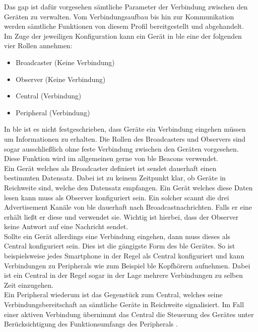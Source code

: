 \noindent Das \ac{gap} ist dafür vorgesehen sämtliche Parameter der Verbindung zwischen den Geräten zu verwalten. Vom Verbindungsaufbau bis hin zur Kommunikation werden sämtliche Funktionen von diesem Profil bereitgestellt und abgehandelt.\\

\noindent Im Zuge der jeweiligen Konfiguration kann ein Gerät in \ac{ble} eine der folgenden vier Rollen annehmen:
\begin{itemize}
	\item{Broadcaster (Keine Verbindung)}
	\item{Observer (Keine Verbindung)}
	\item{Central (Verbindung)}
	\item{Peripheral (Verbindung)}
\end{itemize}   

\noindent In \ac{ble} ist es nicht festgeschrieben, dass Geräte ein Verbindung eingehen müssen um Informationen zu erhalten. Die Rollen des Broadcasters und Observers sind sogar ausschließlich ohne feste Verbindung zwischen den Geräten vorgesehen. Diese Funktion wird im allgemeinen gerne von \ac{ble} Beacons verwendet.\\

\noindent Ein Gerät welches als Broadcaster definiert ist sendet dauerhaft einen bestimmten Datensatz. Dabei ist zu keinem Zeitpunkt klar, ob Geräte in Reichweite sind, welche den Datensatz empfangen. Ein Gerät welches diese Daten lesen kann muss als Observer konfiguriert sein. Ein solcher scannt die drei Advertisement Kanäle von \ac{ble} dauerhaft nach Broadcastnachrichten. Falls er eine erhält ließt er diese und verwendet sie. Wichtig ist hierbei, dass der Observer keine Antwort auf eine Nachricht sendet.\\  

\noindent Sollte ein Gerät allerdings eine Verbindung eingehen, dann muss dieses als Central konfiguriert sein. Dies ist die gängigste Form des \ac{ble} Gerätes. So ist beispielsweise jedes Smartphone in der Regel als Central konfiguriert und kann Verbindungen zu Peripherals wie zum Beispiel \ac{ble} Kopfhörern aufnehmen. Dabei ist ein Central in der Regel sogar in der Lage mehrere Verbindungen zu selben Zeit einzugehen.\\

\noindent Ein Peripheral wiederum ist das Gegenstück zum Central, welches seine Verbindungsbereitschaft an sämtliche Geräte in Reichweite signalisiert. Im Fall einer aktiven Verbindung übernimmt das Central die Steuerung des Gerätes unter Berücksichtigung des Funktionsumfangs des Peripherals \cite[Seite 34]{Usama17:BBS}.\\

